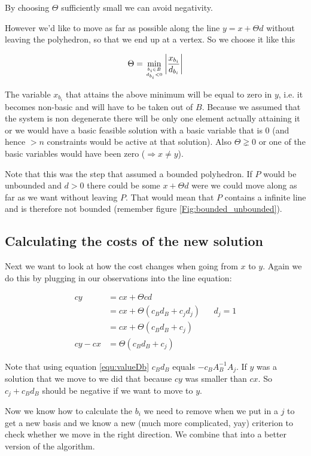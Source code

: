 By choosing $\Theta$ sufficiently small we can avoid negativity. 

However we'd like to move as far as possible along the line $y=x+\Theta d$ without leaving the polyhedron, so that we end up at a vertex. So we choose it like this

\[\Theta = \min_{{b_i\in B}\atop {d_{b_i} <0}} \left| \frac{x_{b_i}}{d_{b_i}}\right |\]

The variable $x_{b_i}$ that attains the above minimum will be equal to zero in $y$, i.e. it becomes non-basic and will have to be taken out of $B$. Because we assumed that the system is non degenerate there will be only one element actually attaining it or we would have a basic feasible solution with a basic variable that is 0 (and hence $>n$ constraints would be active at that solution). Also $\Theta \gneq 0$ or one of the basic variables would have been zero ($\Rightarrow x\neq y$).

Note that this was the step that assumed a bounded polyhedron. If $P$ would be unbounded and $d>0$ there could be some $x+\Theta d$ were we could move along as far as we want without leaving $P$. That would mean that $P$ contains a infinite line and is therefore not bounded (remember figure \ref{Fig:bounded_unbounded}).

\subsection{Calculating the costs of the new solution}
Next we want to look at how the cost changes when going from $x$ to $y$. Again we do this by plugging in our observations into the line equation:

\begin{align*}
cy &= cx + \Theta cd\\
    &= cx + \Theta (c_Bd_B + c_jd_j) &&d_j=1\\
    &= cx + \Theta (c_Bd_B + c_j)\\
cy - cx &= \Theta (c_Bd_B +c_j)
\end{align*}

Note that using equation \ref{equ:valueDb} $c_Bd_B$ equals $- c_B A^{-1}_B A_j$.
If $y$ was a solution that we move to we did that because $cy$ was smaller than $cx$. So $c_j + c_Bd_B$ should be negative if we want to move to $y$. 

Now we know how to calculate the $b_i$ we need to remove when we put in a $j$ to get a new basis and we know a new (much more complicated, yay) criterion to check whether we move in the right direction. We combine that into a better version of the algorithm.


